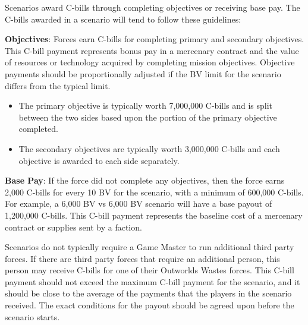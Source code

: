 Scenarios award C-bills through completing objectives or receiving base pay.
The C-bills awarded in a scenario will tend to follow these guidelines:

\begin{description}

\item {\bfseries Objectives}: Forces earn C-bills for completing primary and secondary objectives.
This C-bill payment represents bonus pay in a mercenary contract and the value of resources or technology acquired by completing mission objectives.
Objective payments should be proportionally adjusted if the BV limit for the scenario differs from the typical limit.

\begin{itemize}

\item The primary objective is typically worth 7,000,000 C-bills and is split between the two sides based upon the portion of the primary objective completed.

\item The secondary objectives are typically worth 3,000,000 C-bills and each objective is awarded to each side separately.

\end{itemize}

\item {\bfseries Base Pay}: If the force did not complete any objectives, then the force earns 2,000 C-bills for every 10 BV for the scenario, with a minimum of 600,000 C-bills.
For example, a 6,000 BV vs 6,000 BV scenario will have a base payout of 1,200,000 C-bills.
This C-bill payment represents the baseline cost of a mercenary contract or supplies sent by a faction.

\end{description}

Scenarios do not typically require a Game Master to run additional third party forces.
If there are third party forces that require an additional person, this person may receive C-bills for one of their Outworlds Wastes forces.
This C-bill payment should not exceed the maximum C-bill payment for the scenario, and it should be close to the average of the payments that the players in the scenario received.
The exact conditions for the payout should be agreed upon before the scenario starts.
